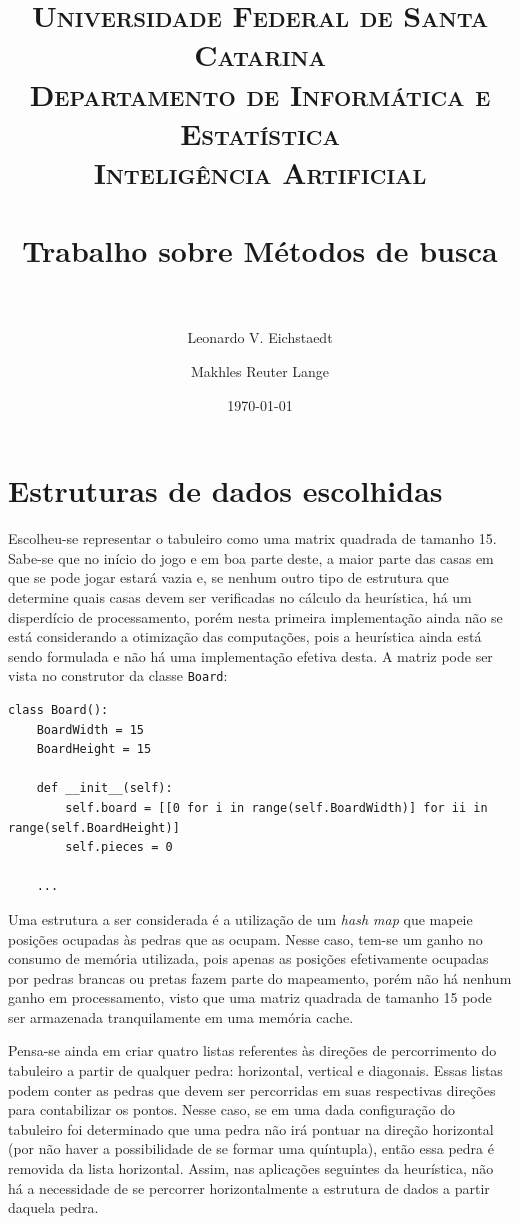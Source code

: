 \documentclass[10pt,a4paper]{article}
\title{
	\usefont{OT1}{bch}{b}{n}
	\normalfont \Large \textsc{Universidade Federal de Santa Catarina\\
		Departamento de Informática e Estatística\\
		Inteligência Artificial
	} \\ [25pt]
	\horrule{0.5pt} \\[0.4cm]
	\huge Trabalho sobre Métodos de busca \\
	\horrule{2pt} \\[0.5cm]
}
\author{Leonardo V. Eichstaedt\\
        \and
        Makhles Reuter Lange
}
\date{\today}
\begin{document}
\maketitle


\section{Estruturas de dados escolhidas}

Escolheu-se representar o tabuleiro como uma matrix quadrada de tamanho 15. Sabe-se que no início do jogo e em boa parte deste, a maior parte das casas em que se pode jogar estará vazia e, se nenhum outro tipo de estrutura que determine quais casas devem ser verificadas no cálculo da heurística, há um disperdício de processamento, porém nesta primeira implementação ainda não se está considerando a otimização das computações, pois a heurística ainda está sendo formulada e não há uma implementação efetiva desta. A matriz pode ser vista no construtor da classe \texttt{Board}:
%
\begin{verbatim}
class Board():
    BoardWidth = 15
    BoardHeight = 15

    def __init__(self):
        self.board = [[0 for i in range(self.BoardWidth)] for ii in range(self.BoardHeight)]
        self.pieces = 0

    ...
\end{verbatim}

Uma estrutura a ser considerada é a utilização de um \emph{hash map} que mapeie posições ocupadas às pedras que as ocupam. Nesse caso, tem-se um ganho no consumo de memória utilizada, pois apenas as posições efetivamente ocupadas por pedras brancas ou pretas fazem parte do mapeamento, porém não há nenhum ganho em processamento, visto que uma matriz quadrada de tamanho 15 pode ser armazenada tranquilamente em uma memória cache.

Pensa-se ainda em criar quatro listas referentes às direções de percorrimento do tabuleiro a partir de qualquer pedra: horizontal, vertical e diagonais. Essas listas podem conter as pedras que devem ser percorridas em suas respectivas direções para contabilizar os pontos. Nesse caso, se em uma dada configuração do tabuleiro foi determinado que uma pedra não irá pontuar na direção horizontal (por não haver a possibilidade de se formar uma quíntupla), então essa pedra é removida da lista horizontal. Assim, nas aplicações seguintes da heurística, não há a necessidade de se percorrer horizontalmente a estrutura de dados a partir daquela pedra.
\end{document}
